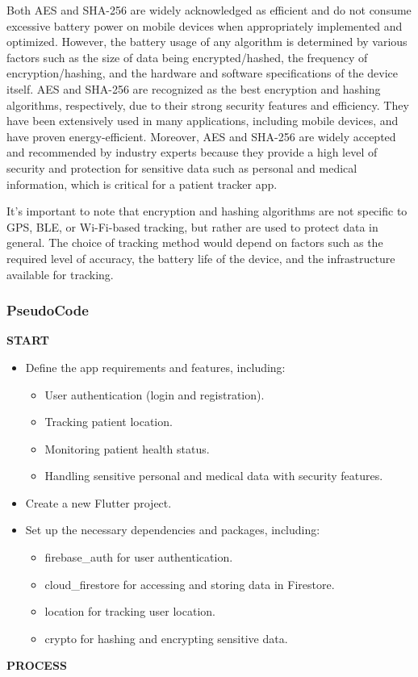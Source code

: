 \documentclass[12pt]{article}
\begin{document}
			Both AES and SHA-256 are widely acknowledged as efficient and do not consume excessive battery power on mobile devices when appropriately implemented and optimized. However, the battery usage of any algorithm is determined by various factors such as the size of data being encrypted/hashed, the frequency of encryption/hashing, and the hardware and software specifications of the device itself.
			AES and SHA-256 are recognized as the best encryption and hashing algorithms, respectively, due to their strong security features and efficiency. They have been extensively used in many applications, including mobile devices, and have proven energy-efficient. Moreover, AES and SHA-256 are widely accepted and recommended by industry experts because they provide a high level of security and protection for sensitive data such as personal and medical information, which is critical for a patient tracker app.
			
			It's important to note that encryption and hashing algorithms are not specific to GPS, BLE, or Wi-Fi-based tracking, but rather are used to protect data in general. The choice of tracking method would depend on factors such as the required level of accuracy, the battery life of the device, and the infrastructure available for tracking.
			
			\subsubsection{PseudoCode}
			\textbf{START}
			
			\begin{itemize}
				\item Define the app requirements and features, including:
				\begin{itemize}
					\item User authentication (login and registration).
					\item Tracking patient location.
					\item Monitoring patient health status.
					\item Handling sensitive personal and medical data with security features.
				\end{itemize}
				\item Create a new Flutter project.
				\item Set up the necessary dependencies and packages, including:
				\begin{itemize}
					\item firebase\_auth for user authentication.
					\item cloud\_firestore for accessing and storing data in Firestore.
					\item location for tracking user location.
					\item crypto for hashing and encrypting sensitive data.
				\end{itemize}
			\end{itemize}
			\textbf{PROCESS}
			
\end{document}
